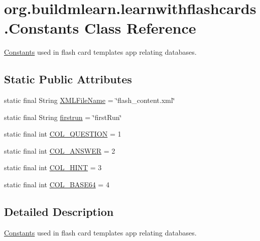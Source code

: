 \hypertarget{classorg_1_1buildmlearn_1_1learnwithflashcards_1_1Constants}{}\section{org.\+buildmlearn.\+learnwithflashcards.\+Constants Class Reference}
\label{classorg_1_1buildmlearn_1_1learnwithflashcards_1_1Constants}


\hyperlink{classorg_1_1buildmlearn_1_1learnwithflashcards_1_1Constants}{Constants} used in flash card template\textquotesingle{}s app relating databases.  


\subsection*{Static Public Attributes}
\begin{DoxyCompactItemize}
\item 
static final String \hyperlink{classorg_1_1buildmlearn_1_1learnwithflashcards_1_1Constants_a77c0991f80b2756b02f410eb1d5c862f}{X\+M\+L\+File\+Name} = \char`\"{}flash\+\_\+content.\+xml\char`\"{}
\item 
static final String \hyperlink{classorg_1_1buildmlearn_1_1learnwithflashcards_1_1Constants_af9fbfffd0155d7642f52708141d3cb4c}{firstrun} = \char`\"{}first\+Run\char`\"{}
\item 
static final int \hyperlink{classorg_1_1buildmlearn_1_1learnwithflashcards_1_1Constants_ace15dd1be4511ac838d21eff96274f83}{C\+O\+L\+\_\+\+Q\+U\+E\+S\+T\+I\+ON} = 1
\item 
static final int \hyperlink{classorg_1_1buildmlearn_1_1learnwithflashcards_1_1Constants_abe1852a3649016249246fb60a327a99b}{C\+O\+L\+\_\+\+A\+N\+S\+W\+ER} = 2
\item 
static final int \hyperlink{classorg_1_1buildmlearn_1_1learnwithflashcards_1_1Constants_a7aa2300158e0e5454d97c4e8f3c60bbe}{C\+O\+L\+\_\+\+H\+I\+NT} = 3
\item 
static final int \hyperlink{classorg_1_1buildmlearn_1_1learnwithflashcards_1_1Constants_af71fe28fcbee24d4d5a0d16b02fc5365}{C\+O\+L\+\_\+\+B\+A\+S\+E64} = 4
\end{DoxyCompactItemize}


\subsection{Detailed Description}
\hyperlink{classorg_1_1buildmlearn_1_1learnwithflashcards_1_1Constants}{Constants} used in flash card template\textquotesingle{}s app relating databases. 

